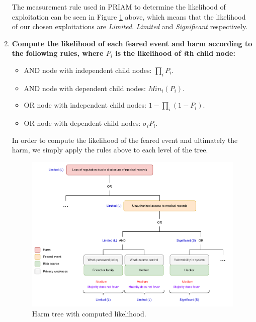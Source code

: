 \begin{enumerate}
        The measurement rule used in PRIAM to determine the likelihood of
        exploitation can be seen in Figure \ref{fig:measurement} above, which means that
        the likelihood of our chosen exploitations are \textit{Limited}.
        \textit{Limited} and \textit{Significant} respectively.

  \item{\textbf{Compute the likelihood of each feared event and harm according to the following
        rules, where $P_i$ is the likelihood of \textit{i}th child node:}}
        \begin{itemize}
          \item AND node with independent child nodes: $\prod_{i}P_{i}$.
          \item AND node with dependent child nodes: $Min_{i}(P_{i})$.
          \item OR node with independent child nodes: $1-\prod_{i}(1-P_{i})$.
          \item OR node with dependent child nodes: $\sigma_{i}P_{i}$.
        \end{itemize}

        In order to compute the likelihood of the feared event and ultimately
        the harm, we simply apply the rules above to each level of the tree.

        \begin{figure}[hbt!]
          \centering
          \includegraphics[width=\textwidth]{pictures/harm_tree_wrl.png}
          \caption{Harm tree with computed likelihood.}
          \label{fig:measurement}
        \end{figure}
\end{enumerate}
